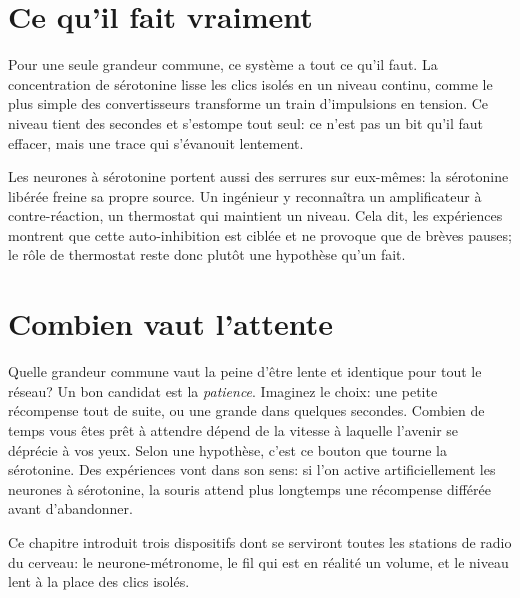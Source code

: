 
\section*{Ce qu'il fait vraiment}

Pour une seule grandeur commune, ce système a tout ce qu'il faut. La concentration de sérotonine lisse les clics isolés en un niveau continu, comme le plus simple des convertisseurs transforme un train d'impulsions en tension. Ce niveau tient des secondes et s'estompe tout seul: ce n'est pas un bit qu'il faut effacer, mais une trace qui s'évanouit lentement.

Les neurones à sérotonine portent aussi des \og serrures\fg{} sur eux-mêmes: la sérotonine libérée freine sa propre source. Un ingénieur y reconnaîtra un amplificateur à contre-réaction, un thermostat qui maintient un niveau. Cela dit, les expériences montrent que cette auto-inhibition est ciblée et ne provoque que de brèves pauses; le rôle de thermostat reste donc plutôt une hypothèse qu'un fait.

\section*{Combien vaut l'attente}

Quelle grandeur commune vaut la peine d'être lente et identique pour tout le réseau? Un bon candidat est la \emph{patience}. Imaginez le choix: une petite récompense tout de suite, ou une grande dans quelques secondes. Combien de temps vous êtes prêt à attendre dépend de la vitesse à laquelle l'avenir se \og déprécie\fg{} à vos yeux. Selon une hypothèse, c'est ce bouton que tourne la sérotonine. Des expériences vont dans son sens: si l'on active artificiellement les neurones à sérotonine, la souris attend plus longtemps une récompense différée avant d'abandonner.

Ce chapitre introduit trois dispositifs dont se serviront toutes les stations de radio du cerveau: le neurone-métronome, le \og fil\fg{} qui est en réalité un volume, et le niveau lent à la place des clics isolés.

